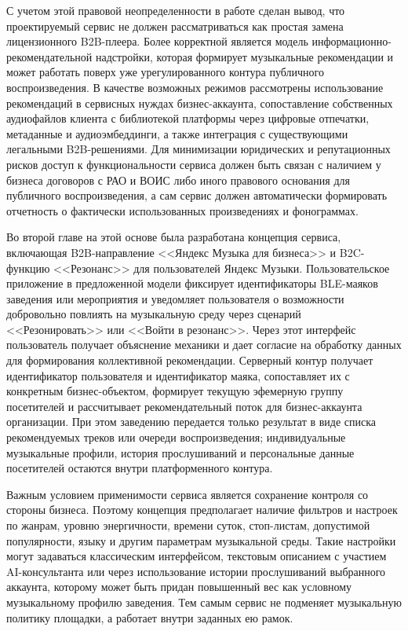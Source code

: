 С учетом этой правовой неопределенности в работе сделан вывод, что проектируемый сервис не должен рассматриваться как простая замена лицензионного B2B-плеера. Более корректной является модель информационно-рекомендательной надстройки, которая формирует музыкальные рекомендации и может работать поверх уже урегулированного контура публичного воспроизведения. В качестве возможных режимов рассмотрены использование рекомендаций в сервисных нуждах бизнес-аккаунта, сопоставление собственных аудиофайлов клиента с библиотекой платформы через цифровые отпечатки, метаданные и аудиоэмбеддинги, а также интеграция с существующими легальными B2B-решениями. Для минимизации юридических и репутационных рисков доступ к функциональности сервиса должен быть связан с наличием у бизнеса договоров с РАО и ВОИС либо иного правового основания для публичного воспроизведения, а сам сервис должен автоматически формировать отчетность о фактически использованных произведениях и фонограммах.

Во второй главе на этой основе была разработана концепция сервиса, включающая B2B-направление <<Яндекс Музыка для бизнеса>> и B2C-функцию <<Резонанс>> для пользователей Яндекс Музыки. Пользовательское приложение в предложенной модели фиксирует идентификаторы BLE-маяков заведения или мероприятия и уведомляет пользователя о возможности добровольно повлиять на музыкальную среду через сценарий <<Резонировать>> или <<Войти в резонанс>>. Через этот интерфейс пользователь получает объяснение механики и дает согласие на обработку данных для формирования коллективной рекомендации. Серверный контур получает идентификатор пользователя и идентификатор маяка, сопоставляет их с конкретным бизнес-объектом, формирует текущую эфемерную группу посетителей и рассчитывает рекомендательный поток для бизнес-аккаунта организации. При этом заведению передается только результат в виде списка рекомендуемых треков или очереди воспроизведения; индивидуальные музыкальные профили, история прослушиваний и персональные данные посетителей остаются внутри платформенного контура.

Важным условием применимости сервиса является сохранение контроля со стороны бизнеса. Поэтому концепция предполагает наличие фильтров и настроек по жанрам, уровню энергичности, времени суток, стоп-листам, допустимой популярности, языку и другим параметрам музыкальной среды. Такие настройки могут задаваться классическим интерфейсом, текстовым описанием с участием AI-консультанта или через использование истории прослушиваний выбранного аккаунта, которому может быть придан повышенный вес как условному музыкальному профилю заведения. Тем самым сервис не подменяет музыкальную политику площадки, а работает внутри заданных ею рамок.

